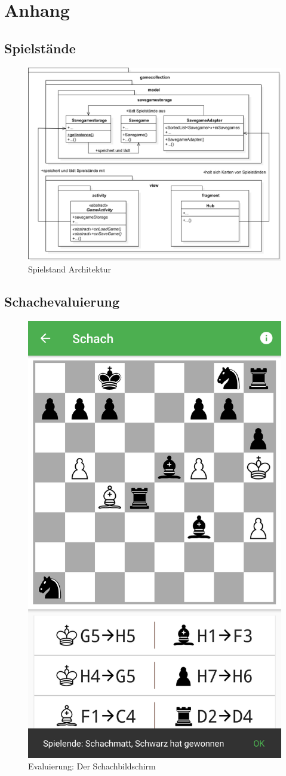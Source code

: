 \chapter{Anhang}

\section{Spielstände}
\sectionauthor{\leonard}

\begin{figure}[h]
	\centering
	\includegraphics[width=1.0\textwidth]{resources/savegamestorage/Savegamestorage}
	\caption{Spielstand Architektur}
\end{figure}

\section{Schachevaluierung}

\begin{figure}[p]
\centering
\includegraphics[width=.3\textwidth]{resources/evaluierung/chess/screen}
\caption{Evaluierung: Der Schachbildschirm}
\label{fig:screen}
\end{figure}

